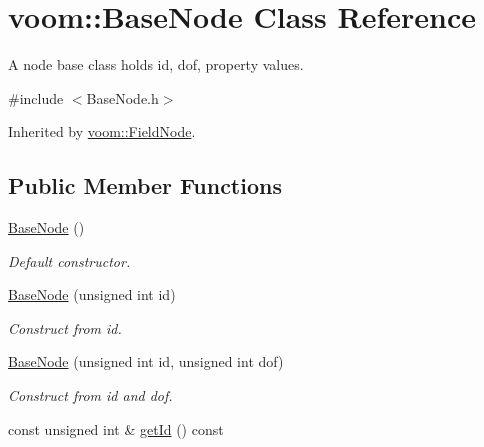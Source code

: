 \hypertarget{classvoom_1_1_base_node}{
\section{voom::BaseNode Class Reference}
\label{classvoom_1_1_base_node}
}


A node base class holds id, dof, property values.  


{\ttfamily \#include $<$BaseNode.h$>$}

Inherited by \hyperlink{classvoom_1_1_field_node}{voom::FieldNode}.\subsection*{Public Member Functions}
\begin{DoxyCompactItemize}
\item 
\hypertarget{classvoom_1_1_base_node_a5fcc47ea41f7287114f24234584d7fba}{
\hyperlink{classvoom_1_1_base_node_a5fcc47ea41f7287114f24234584d7fba}{BaseNode} ()}
\label{classvoom_1_1_base_node_a5fcc47ea41f7287114f24234584d7fba}

\begin{DoxyCompactList}\small\item\em Default constructor. \item\end{DoxyCompactList}\item 
\hypertarget{classvoom_1_1_base_node_aa3391e7d131e0ec2404d5dbb32736c94}{
\hyperlink{classvoom_1_1_base_node_aa3391e7d131e0ec2404d5dbb32736c94}{BaseNode} (unsigned int id)}
\label{classvoom_1_1_base_node_aa3391e7d131e0ec2404d5dbb32736c94}

\begin{DoxyCompactList}\small\item\em Construct from id. \item\end{DoxyCompactList}\item 
\hypertarget{classvoom_1_1_base_node_a4ff8318aaf5ebfc213fcbc3da0ef3049}{
\hyperlink{classvoom_1_1_base_node_a4ff8318aaf5ebfc213fcbc3da0ef3049}{BaseNode} (unsigned int id, unsigned int dof)}
\label{classvoom_1_1_base_node_a4ff8318aaf5ebfc213fcbc3da0ef3049}

\begin{DoxyCompactList}\small\item\em Construct from id and dof. \item\end{DoxyCompactList}\item 
\hypertarget{classvoom_1_1_base_node_ad3cfe582a9063e0331717045e4918ce9}{
const unsigned int \& \hyperlink{classvoom_1_1_base_node_ad3cfe582a9063e0331717045e4918ce9}{getId} () const }
\label{classvoom_1_1_base_node_ad3cfe582a9063e0331717045e4918ce9}


\end{DoxyCompactItemize}
